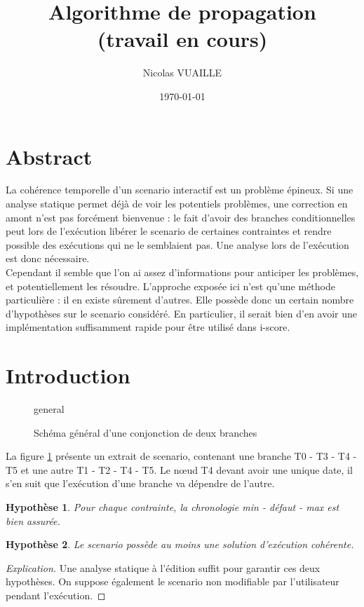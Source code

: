 \documentclass[10pt,a4paper]{article}
\author{Nicolas VUAILLE}
\title{Algorithme de propagation \\ (travail en cours)}
\date{\today}
\newtheorem{presup}{Hypothèse}
\begin{document}
\maketitle

\section*{Abstract}

La cohérence temporelle d'un scenario interactif est un problème épineux. Si une analyse statique permet déjà de voir les potentiels problèmes, une correction en amont n'est pas forcément bienvenue : le fait d'avoir des branches conditionnelles peut lors de l'exécution libérer le scenario de certaines contraintes et rendre possible des exécutions qui ne le semblaient pas. Une analyse lors de l'exécution est donc nécessaire. \\

Cependant il semble que l'on ai assez d'informations pour anticiper les problèmes, et potentiellement les résoudre. L'approche exposée ici n'est qu'une méthode particulière : il en existe sûrement d'autres. Elle possède donc un certain nombre d'hypothèses sur le scenario considéré. En particulier, il serait bien d'en avoir une implémentation suffisamment rapide pour être utilisé dans i-score. \\

\tableofcontents

\newpage
\section{Introduction}

	\begin{figure}[h]
		\centering
		
		\schemaScenario general
		\caption{Schéma général d'une conjonction de deux branches}
		\label{S:general}
	\end{figure}

La figure \ref{S:general} présente un extrait de scenario, contenant une branche T0 - T3 - T4 - T5 et une autre T1 - T2 - T4 - T5. Le nœud T4 devant avoir une unique date, il s'en suit que l'exécution d'une branche va dépendre de l'autre.

	\begin{presup}
		Pour chaque contrainte, la chronologie min - défaut - max est bien assurée.
		\label{P:Chronologie}
	\end{presup}
	\begin{presup}
		Le scenario possède au moins une solution d'exécution cohérente.
		\label{P:Executabilite}
	\end{presup}
	\begin{proof}[Explication]
		Une analyse statique à l'édition suffit pour garantir ces deux hypothèses. On suppose également le scenario non modifiable par l'utilisateur pendant l'exécution.
	\end{proof}
\end{document}
